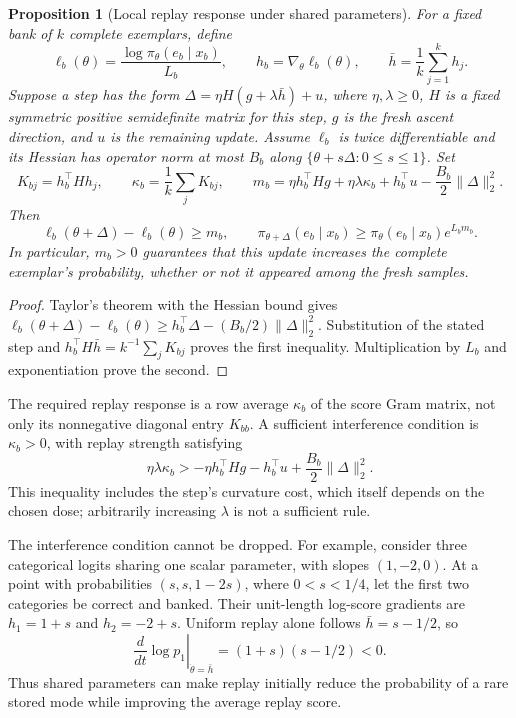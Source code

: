 \documentclass{article}
\newcommand{\enforcehalffinalproseline}{%
  \setlength{\parfillskip}{0pt plus .20\linewidth}}
\newcommand{\1}{\mathbf 1}
\newtheorem{proposition}[lemma]{Proposition}
\theoremstyle{remark}
\theoremstyle{definition}
\theoremstyle{plain}
\begin{document}
\begin{proposition}[Local replay response under shared parameters]
\enforcehalffinalproseline
\label{prop:neural-replay-local-response}
For a fixed bank of $k$ complete exemplars, define
\[
 \ell_b(\theta)=\frac{\log\pi_\theta(e_b\mid x_b)}{L_b},\qquad
 h_b=\nabla_\theta\ell_b(\theta),\qquad
 \bar h=\frac1k\sum_{j=1}^k h_j.
\]
Suppose a step has the form
$\Delta=\eta H(g+\lambda\bar h)+u$, where $\eta,\lambda\ge0$,
$H$ is a fixed symmetric positive semidefinite matrix for this step,
$g$ is the fresh ascent direction, and $u$ is the remaining update.
Assume $\ell_b$ is twice differentiable and its Hessian has operator norm
at most $B_b$ along $\{\theta+s\Delta:0\le s\le1\}$.
Set
\[
 K_{bj}=h_b^\top Hh_j,\qquad
 \kappa_b=\frac1k\sum_jK_{bj},\qquad
 m_b=\eta h_b^\top Hg+\eta\lambda\kappa_b
       +h_b^\top u-\frac{B_b}{2}\|\Delta\|_2^2.
\]
Then
\begin{equation}
 \ell_b(\theta+\Delta)-\ell_b(\theta)\ge m_b,
 \qquad
 \pi_{\theta+\Delta}(e_b\mid x_b)
    \ge\pi_\theta(e_b\mid x_b)e^{L_bm_b}.
 \label{eq:neural-replay-local-response}
\end{equation}
In particular, $m_b>0$ guarantees that this update increases the complete
exemplar's probability, whether or not it appeared among the fresh samples.
\end{proposition}

\begin{proof}
\enforcehalffinalproseline
Taylor's theorem with the Hessian bound gives
$\ell_b(\theta+\Delta)-\ell_b(\theta)
 \ge h_b^\top\Delta-(B_b/2)\|\Delta\|_2^2$.
Substitution of the stated step and
$h_b^\top H\bar h=k^{-1}\sum_jK_{bj}$ proves the first inequality.
Multiplication by $L_b$ and exponentiation prove the second.
\end{proof}

The required replay response is a row average $\kappa_b$ of the score Gram
matrix, not only its nonnegative diagonal entry $K_{bb}$. A sufficient
interference condition is $\kappa_b>0$, with replay strength satisfying
\[
 \eta\lambda\kappa_b>
   -\eta h_b^\top Hg-h_b^\top u
       +\frac{B_b}{2}\|\Delta\|_2^2.
\]
This inequality includes the step's curvature cost, which itself depends on
the chosen dose; arbitrarily increasing $\lambda$ is not a sufficient rule.

The interference condition cannot be dropped. For example, consider three
categorical logits sharing one scalar parameter, with slopes $(1,-2,0)$.
At a point with probabilities $(s,s,1-2s)$, where $0<s<1/4$, let the first
two categories be correct and banked. Their unit-length log-score gradients
are $h_1=1+s$ and $h_2=-2+s$. Uniform replay alone follows
$\bar h=s-1/2$, so
\[
 \left.\frac{d}{dt}\log p_1\right|_{\dot\theta=\bar h}
   =(1+s)(s-1/2)<0.
\]
Thus shared parameters can make replay initially reduce the probability of
a rare stored mode while improving the average replay score.
\end{document}
